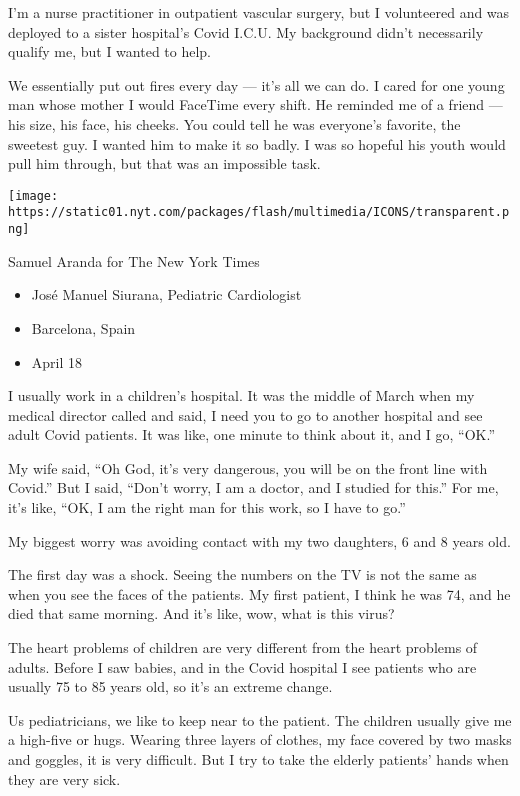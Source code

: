 I'm a nurse practitioner in outpatient vascular surgery, but I
volunteered and was deployed to a sister hospital's Covid I.C.U. My
background didn't necessarily qualify me, but I wanted to help.

We essentially put out fires every day --- it's all we can do. I cared
for one young man whose mother I would FaceTime every shift. He reminded
me of a friend --- his size, his face, his cheeks. You could tell he was
everyone's favorite, the sweetest guy. I wanted him to make it so badly.
I was so hopeful his youth would pull him through, but that was an
impossible task.

\texttt{[image: https://static01.nyt.com/packages/flash/multimedia/ICONS/transparent.png]}

Samuel Aranda for The New York Times

\begin{itemize}
\tightlist
\item
  José Manuel Siurana, Pediatric Cardiologist
\item
  Barcelona, Spain
\item
  April 18
\end{itemize}

I usually work in a children's hospital. It was the middle of March when
my medical director called and said, I need you to go to another
hospital and see adult Covid patients. It was like, one minute to think
about it, and I go, ``OK.''

My wife said, ``Oh God, it's very dangerous, you will be on the front
line with Covid.'' But I said, ``Don't worry, I am a doctor, and I
studied for this.'' For me, it's like, ``OK, I am the right man for this
work, so I have to go.''

My biggest worry was avoiding contact with my two daughters, 6 and 8
years old.

The first day was a shock. Seeing the numbers on the TV is not the same
as when you see the faces of the patients. My first patient, I think he
was 74, and he died that same morning. And it's like, wow, what is this
virus?

The heart problems of children are very different from the heart
problems of adults. Before I saw babies, and in the Covid hospital I see
patients who are usually 75 to 85 years old, so it's an extreme change.

Us pediatricians, we like to keep near to the patient. The children
usually give me a high-five or hugs. Wearing three layers of clothes, my
face covered by two masks and goggles, it is very difficult. But I try
to take the elderly patients' hands when they are very sick.

